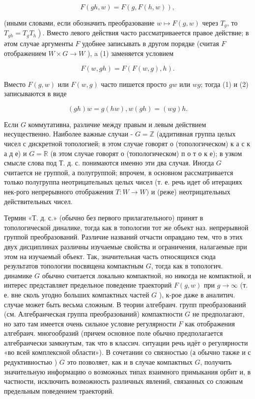 \documentclass[10pt]{article}
\begin{document}
\[

F(g h, w)=F(g, F(h, w)),

\]



(иными словами, если обозначить преобразование $w \mapsto F(g, w)$ через $T_{g}$, то $\left.T_{g h}=T_{g} T_{h}\right)$. Вместо левого действия часто рассматриваеется правое действие; в әтом случае аргументы $F$ удобнее записывать в другом порядке (считая $F$ отображением $W \times G \rightarrow W$ ), a (1) заменяется условием



\[

F(w, g h)=F(F(w, g), h) .

\]



Вместо $F(g, w)$ или $F(w, g)$ часто пишется просто $g w$ или $w g$; тогда (1) и (2) записываются в виде



\[

(g h) w=g(h w), w(g h)=(w g) h .

\]



Если $G$ коммутативна, различие между правым и левым действием несущественно. Наиболее важные случаи - $G=\mathbb{Z}$ (аддитивная группа целых чисел с дискретной топологией; в этом случае говорят о (топологическом) к а с к а д е) и $G=\mathbb{R}$ (в этом случае говорят о (топологическом) п о т о к е); в узком смысле слова под Т. д. с. понимаются именно эти два случая. Иногда $G$ считается не группой, а полугруппой; впрочем, в основном рассматривается только полугруппа неотрицательных целых чисел (т. е. речь идет об итерациях нек-рого непрерывного отображения $T: W \rightarrow W)$ и (реже) неотрицательных действительных чисел.



Термин «Т. д. с.» (обычно без первого прилагательного) принят в топологической диналике, тогда как в топологии тот же объект наз. непрерывной группой преобразований. Различие названий отчасти оправдано тем, что в этих двух дисциплинах различны изучаемые свойства и ограничения, налагаемые при этом на изучаемый объект. Так, значительная часть относящихся сюда результатов топологии посвящена компактным $G$, тогда как в топологич. динамике $G$ обычно считается локально компактной, но никогда не компактной, и интерес представляет предельное поведение траекторий $F(g, w)$ при $g \rightarrow \infty$ (т. е. вне сколь угодно больших компактных частей $G$ ), к-рое даже в аналитич. случае может быть весьма сложным. В теории алгебраич. групп преобразований (см. Алгебраическая группа преобразований) компактности $G$ не предполагают, но зато там имеется очень сильное условие регулярности $F$ как отображения алгебраич. многообразий (причем основное поле обычно предполагается алгебраически замкнутым, так что в классич. ситуации речь идёт о регулярности «во всей комплексной области»). В сочетании со связностью (а обычно также и с редуктивностью ) $G$ это позволяет, как и в случае компактных $G$, получить значительную информацию о возможных типах взаимного примыкания орбит и, в частности, исключить возможность различных явлений, связанных со сложным предельным поведением траекторий.
\end{document}
